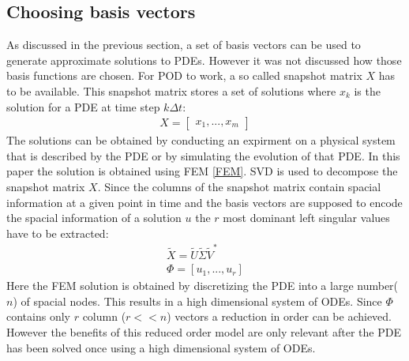 \subsection{Choosing basis vectors}
As discussed in the previous section, a set of basis vectors can be used to generate approximate solutions to PDEs.
However it was not discussed how those basis functions are chosen.
For POD to work, a so called snapshot matrix \(X\) has to be available.
This snapshot matrix stores a set of solutions where \(x_k\) is the solution for a PDE at time step \(k\Delta t\):
\begin{gather}
X = \begin{bmatrix}
x_1, ..., x_m
\end{bmatrix}
\end{gather}
The solutions can be obtained by conducting an expirment on a physical system that is described by the PDE or by simulating the evolution of that PDE.
In this paper the solution is obtained using FEM \ref{FEM}.
SVD is used to decompose the snapshot matrix \(X\).
Since the columns of the snapshot matrix contain spacial information at a given point in time and the basis vectors are supposed to encode the spacial information of a solution \(u\) the \(r\) most dominant left singular values have to be extracted:
\begin{gather}
\tilde{X} = \tilde{U}\tilde{\Sigma}\tilde{V}^{*} \\
\Phi = [u_1, ..., u_r]
\end{gather}
Here the FEM solution is obtained by discretizing the PDE into a large number(\(n\)) of spacial nodes.
This results in a high dimensional system of ODEs.
Since \(\Phi\) contains only \(r\) column (\(r << n\)) vectors a reduction in order can be achieved.
However the benefits of this reduced order model are only relevant after the PDE has been solved once using a high dimensional system of ODEs.
\cite{brunton_kutz_2019c}